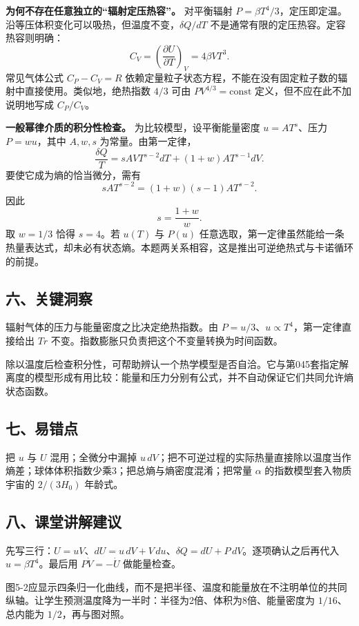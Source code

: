 \documentclass[12pt,a4paper,UTF8]{ctexart}
\begin{document}
\textbf{为何不存在任意独立的``辐射定压热容''。} 对平衡辐射
\(P=\beta T^4/3\)，定压即定温。沿等压体积变化可以吸热，但温度不变，\(\delta Q/dT\)
不是通常有限的定压热容。定容热容则明确： \[
C_V=\left(\frac{\partial U}{\partial T}\right)_V=4\beta VT^3.
\] 常见气体公式 \(C_P-C_V=R\)
依赖定量粒子状态方程，不能在没有固定粒子数的辐射中直接使用。类似地，绝热指数
\(4/3\) 可由 \(PV^{4/3}=\mathrm{const}\) 定义，但不应在此不加说明地写成
\(C_P/C_V\)。

\textbf{一般幂律介质的积分性检查。} 为比较模型，设平衡能量密度
\(u=A T^s\)、压力 \(P=w u\)，其中 \(A,w,s\) 为常量。由第一定律， \[
\frac{\delta Q}{T}
=sAVT^{s-2}dT+(1+w)AT^{s-1}dV.
\] 要使它成为熵的恰当微分，需有 \[
sAT^{s-2}=(1+w)(s-1)AT^{s-2}.
\] 因此 \[
\boxed{s=\frac{1+w}{w}}.
\] 取 \(w=1/3\) 恰得 \(s=4\)。若 \(u(T)\) 与 \(P(u)\)
任意选取，第一定律虽然能给一条热量表达式，却未必有状态熵。本题两关系相容，这是推出可逆绝热式与卡诺循环的前提。

\subsection{六、关键洞察}\label{ux516dux5173ux952eux6d1eux5bdf-4}

辐射气体的压力与能量密度之比决定绝热指数。由
\(P=u/3\)、\(u\propto T^4\)，第一定律直接给出 \(Tr\)
不变。指数膨胀只负责把这个不变量转换为时间函数。

除以温度后检查积分性，可帮助辨认一个热学模型是否自洽。它与第045套指定解离度的模型形成有用比较：能量和压力分别有公式，并不自动保证它们共同允许熵状态函数。

\subsection{七、易错点}\label{ux4e03ux6613ux9519ux70b9-4}

把 \(u\) 与 \(U\) 混用；全微分中漏掉
\(u\,dV\)；把不可逆过程的实际热量直接除以温度当作熵差；球体体积指数少乘3；把总熵与熵密度混淆；把常量
\(\alpha\) 的指数模型套入物质宇宙的 \(2/(3H_0)\) 年龄式。

\subsection{八、课堂讲解建议}\label{ux516bux8bfeux5802ux8bb2ux89e3ux5efaux8bae-4}

先写三行：\(U=uV\)、\(dU=u\,dV+V\,du\)、\(\delta Q=dU+P\,dV\)。逐项确认之后再代入
\(u=\beta T^4\)。最后用 \(P\dot V=-\dot U\) 做能量检查。

图5-2应显示四条归一化曲线，而不是把半径、温度和能量放在不注明单位的共同纵轴。让学生预测温度降为一半时：半径为2倍、体积为8倍、能量密度为
\(1/16\)、总内能为 \(1/2\)，再与图对照。
\end{document}
